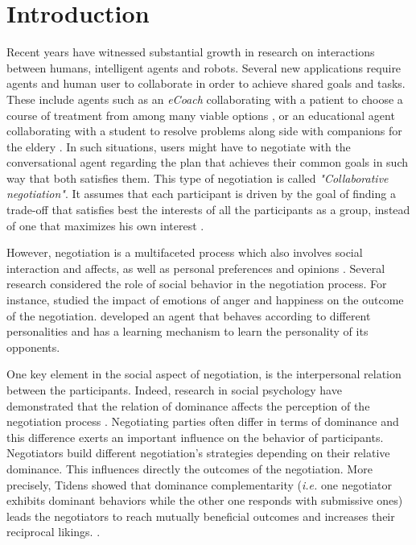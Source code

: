 \documentclass[conference, letterpaper]{IEEEtran}
\begin{document}
	\section{Introduction}
		Recent years have witnessed substantial growth in research on interactions between humans, intelligent agents and robots. Several new applications require agents and human user to collaborate in order to achieve shared goals and tasks. These include agents such as an \textit{eCoach} collaborating with a patient to choose a course of treatment from among many viable options \cite{robertson2015visual}, or an educational agent collaborating with a student to resolve problems \cite{howard2017shifting} along side with companions for the eldery \cite{sidner2014robotic}. 
		In such situations, users might have to negotiate with the conversational agent regarding the plan that achieves their common goals in such way that both satisfies them. This type of negotiation is called \emph{"Collaborative negotiation"}. It assumes that each participant is driven by the goal of finding a trade-off that satisfies best the interests of all the participants as a group, instead of one that maximizes his own interest \cite{sidner1994artificial,chu1995response}.
	
		However, negotiation is a multifaceted process which also involves social interaction and affects, as well as personal preferences and opinions  \cite{bro2010affective}. Several research considered the role of social behavior in the negotiation process. For instance, \cite{de2011effect} studied the impact of emotions of anger and happiness on the outcome of the negotiation.  \cite{kraus1995designing} developed an agent that behaves according to different personalities and has a learning mechanism to learn the personality of its opponents. 
	
		One key element in the social aspect of negotiation, is the interpersonal relation between the participants. Indeed, research in social psychology have demonstrated that the relation of dominance affects the perception of the negotiation process \cite{van2006power}.  
		Negotiating parties often differ in terms of dominance and this difference exerts an important influence on the behavior of participants. Negotiators build different negotiation's strategies depending on their relative dominance. This influences directly the outcomes of the negotiation. More precisely, Tidens \cite{tiedens2003power} showed that dominance complementarity (\emph{i.e.} one negotiator exhibits dominant behaviors while the other one responds with submissive ones) leads the negotiators to reach mutually beneficial outcomes and increases their reciprocal likings. \cite{wiltermuth2015benefits,tiedens2003power}.
	
\end{document}
